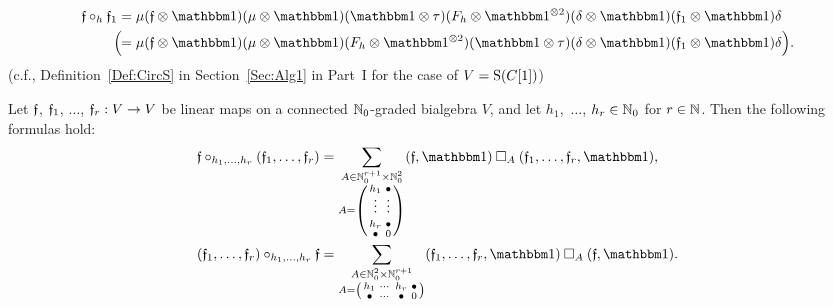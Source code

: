 \documentclass[\MainFolder/Text.tex]{subfiles}
\begin{document}
\begin{Definition}
\begin{align*}
\MVMorF \circ_h \MVMorF_1 &= \MVProd(\MVMorF\otimes \Id)(\MVProd\otimes\Id)(\Id\otimes\tau)(F_h\otimes\Id^{\otimes 2})(\MVCoProd\otimes \Id)(\MVMorF_1 \otimes \Id)\MVCoProd \\
\Bigl(\!\!&= \MVProd(\MVMorF\otimes \Id)(\MVProd\otimes\Id)(F_h\otimes\Id^{\otimes 2})(\Id\otimes\tau)(\MVCoProd\otimes \Id)(\MVMorF_1 \otimes \Id)\MVCoProd\Bigr).
\end{align*}
(c.f., Definition~\ref{Def:CircS} in Section~\ref{Sec:Alg1} in Part~I for the case of $V = \mathrm{S}(C[1])$)
\end{Definition}

\begin{Proposition}\label{Prop:PartCompAComp}
Let $\mathfrak{f}$, $\mathfrak{f}_1$, $\dotsc$, $\mathfrak{f}_r : V \rightarrow V$ be linear maps on a connected $\mathbb{N}_0$-graded bialgebra $V$, and let $h_1$,~$\dotsc$, $h_r \in \mathbb{N}_0$ for $r\in \mathbb{N}$. Then the following formulas hold:
\begin{align*}
\MVMorF\circ_{h_1, \dotsc, h_r}(\MVMorF_1, \dotsc, \MVMorF_r) &= \sum_{\substack{A \in \N_0^{r+1} \times \N_0^{2} \\ A = \left(\begin{smallmatrix}
h_1 & \bullet \\
\vphantom{\int\limits^x}\smash{\vdots} &  \smash{\vdots} \\
h_r & \bullet \\ 
\bullet & 0
\end{smallmatrix}\right)}} (\MVMorF,\Id)\SquareComp_{A}(\MVMorF_1,\dotsc,\MVMorF_r,\Id), \\
(\MVMorF_1, \dotsc, \MVMorF_r)\circ_{h_1, \dotsc, h_r}\MVMorF &= \sum_{\substack{A \in \N_0^{2} \times \N_0^{r+1} \\ A = \left(\begin{smallmatrix}
h_1 & \dotsb & h_r & \bullet \\
\bullet & \dotsb & \bullet & 0
\end{smallmatrix}\right)
}} (\MVMorF_1,\dotsc,\MVMorF_r,\Id)\SquareComp_A(\MVMorF,\Id).
\end{align*}
\end{Proposition}
\end{document}
